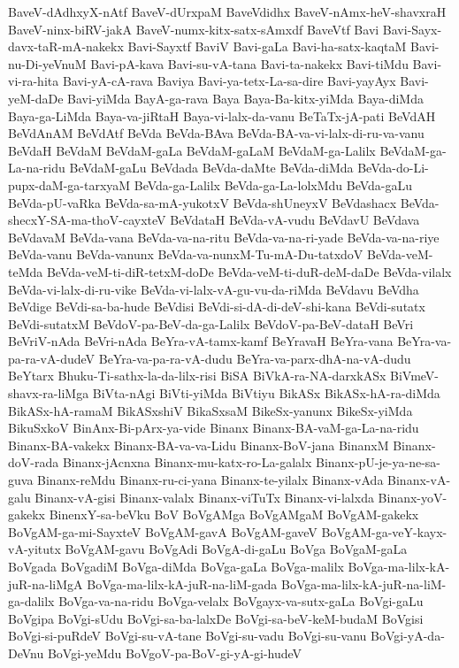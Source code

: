 {BaveV-dAdhxyX-nAtf
BaveV-dUrxpaM
BaveVdidhx
BaveV-nAmx-heV-shavxraH
BaveV-ninx-biRV-jakA
BaveV-numx-kitx-satx-sAmxdf
BaveVtf
Bavi
Bavi-Sayx-davx-taR-mA-nakekx
Bavi-Sayxtf
BaviV
Bavi-gaLa
Bavi-ha-satx-kaqtaM
Bavi-nu-Di-yeVnuM
Bavi-pA-kava
Bavi-su-vA-tana
Bavi-ta-nakekx
Bavi-tiMdu
Bavi-vi-ra-hita
Bavi-yA-cA-rava
Baviya
Bavi-ya-tetx-La-sa-dire
Bavi-yayAyx
Bavi-yeM-daDe
Bavi-yiMda
BayA-ga-rava
Baya
Baya-Ba-kitx-yiMda
Baya-diMda
Baya-ga-LiMda
Baya-va-jiRtaH
Baya-vi-lalx-da-vanu
BeTaTx-jA-pati
BeVdAH
BeVdAnAM
BeVdAtf
BeVda
BeVda-BAva
BeVda-BA-va-vi-lalx-di-ru-va-vanu
BeVdaH
BeVdaM
BeVdaM-gaLa
BeVdaM-gaLaM
BeVdaM-ga-Lalilx
BeVdaM-ga-La-na-ridu
BeVdaM-gaLu
BeVdada
BeVda-daMte
BeVda-diMda
BeVda-do-Li-pupx-daM-ga-tarxyaM
BeVda-ga-Lalilx
BeVda-ga-La-lolxMdu
BeVda-gaLu
BeVda-pU-vaRka
BeVda-sa-mA-yukotxV
BeVda-shUneyxV
BeVdashacx
BeVda-shecxY-SA-ma-thoV-cayxteV
BeVdataH
BeVda-vA-vudu
BeVdavU
BeVdava
BeVdavaM
BeVda-vana
BeVda-va-na-ritu
BeVda-va-na-ri-yade
BeVda-va-na-riye
BeVda-vanu
BeVda-vanunx
BeVda-va-nunxM-Tu-mA-Du-tatxdoV
BeVda-veM-teMda
BeVda-veM-ti-diR-tetxM-doDe
BeVda-veM-ti-duR-deM-daDe
BeVda-vilalx
BeVda-vi-lalx-di-ru-vike
BeVda-vi-lalx-vA-gu-vu-da-riMda
BeVdavu
BeVdha
BeVdige
BeVdi-sa-ba-hude
BeVdisi
BeVdi-si-dA-di-deV-shi-kana
BeVdi-sutatx
BeVdi-sutatxM
BeVdoV-pa-BeV-da-ga-Lalilx
BeVdoV-pa-BeV-dataH
BeVri
BeVriV-nAda
BeVri-nAda
BeYra-vA-tamx-kamf
BeYravaH
BeYra-vana
BeYra-va-pa-ra-vA-dudeV
BeYra-va-pa-ra-vA-dudu
BeYra-va-parx-dhA-na-vA-dudu
BeYtarx
Bhuku-Ti-sathx-la-da-lilx-risi
BiSA
BiVkA-ra-NA-darxkASx
BiVmeV-shavx-ra-liMga
BiVta-nAgi
BiVti-yiMda
BiVtiyu
BikASx
BikASx-hA-ra-diMda
BikASx-hA-ramaM
BikASxshiV
BikaSxsaM
BikeSx-yanunx
BikeSx-yiMda
BikuSxkoV
BinAnx-Bi-pArx-ya-vide
Binanx
Binanx-BA-vaM-ga-La-na-ridu
Binanx-BA-vakekx
Binanx-BA-va-va-Lidu
Binanx-BoV-jana
BinanxM
Binanx-doV-rada
Binanx-jAcnxna
Binanx-mu-katx-ro-La-galalx
Binanx-pU-je-ya-ne-sa-guva
Binanx-reMdu
Binanx-ru-ci-yana
Binanx-te-yilalx
Binanx-vAda
Binanx-vA-galu
Binanx-vA-gisi
Binanx-valalx
Binanx-viTuTx
Binanx-vi-lalxda
Binanx-yoV-gakekx
BinenxY-sa-beVku
BoV
BoVgAMga
BoVgAMgaM
BoVgAM-gakekx
BoVgAM-ga-mi-SayxteV
BoVgAM-gavA
BoVgAM-gaveV
BoVgAM-ga-veY-kayx-vA-yitutx
BoVgAM-gavu
BoVgAdi
BoVgA-di-gaLu
BoVga
BoVgaM-gaLa
BoVgada
BoVgadiM
BoVga-diMda
BoVga-gaLa
BoVga-malilx
BoVga-ma-lilx-kA-juR-na-liMgA
BoVga-ma-lilx-kA-juR-na-liM-gada
BoVga-ma-lilx-kA-juR-na-liM-ga-dalilx
BoVga-va-na-ridu
BoVga-velalx
BoVgayx-va-sutx-gaLa
BoVgi-gaLu
BoVgipa
BoVgi-sUdu
BoVgi-sa-ba-lalxDe
BoVgi-sa-beV-keM-budaM
BoVgisi
BoVgi-si-puRdeV
BoVgi-su-vA-tane
BoVgi-su-vadu
BoVgi-su-vanu
BoVgi-yA-da-DeVnu
BoVgi-yeMdu
BoVgoV-pa-BoV-gi-yA-gi-hudeV
}
